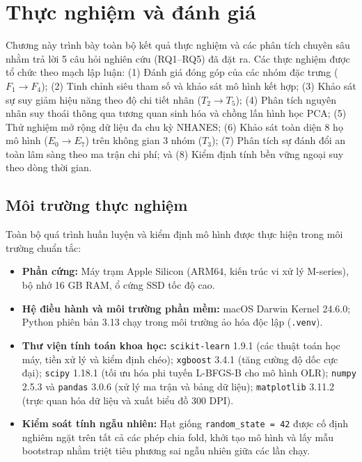 \chapter{Thực nghiệm và đánh giá}
\label{ch:thuc-nghiem}

Chương này trình bày toàn bộ kết quả thực nghiệm và các phân tích chuyên sâu nhằm trả lời 5 câu hỏi nghiên cứu (RQ1--RQ5) đã đặt ra. Các thực nghiệm được tổ chức theo mạch lập luận: (1) Đánh giá đóng góp của các nhóm đặc trưng ($F_1 \to F_4$); (2) Tinh chỉnh siêu tham số và khảo sát mô hình kết hợp; (3) Khảo sát sự suy giảm hiệu năng theo độ chi tiết nhãn ($T_2 \to T_5$); (4) Phân tích nguyên nhân suy thoái thông qua tương quan sinh hóa và chồng lấn hình học PCA; (5) Thử nghiệm mở rộng dữ liệu đa chu kỳ NHANES; (6) Khảo sát toàn diện 8 họ mô hình ($E_0 \to E_7$) trên không gian 3 nhóm ($T_3$); (7) Phân tích sự đánh đổi an toàn lâm sàng theo ma trận chi phí; và (8) Kiểm định tính bền vững ngoại suy theo dòng thời gian.

\section{Môi trường thực nghiệm}
\label{sec:moi-truong-thuc-nghiem}

Toàn bộ quá trình huấn luyện và kiểm định mô hình được thực hiện trong môi trường chuẩn tắc:
\begin{itemize}
    \item \textbf{Phần cứng:} Máy trạm Apple Silicon (ARM64, kiến trúc vi xử lý M-series), bộ nhớ 16 GB RAM, ổ cứng SSD tốc độ cao.
    \item \textbf{Hệ điều hành và môi trường phần mềm:} macOS Darwin Kernel 24.6.0; Python phiên bản 3.13 chạy trong môi trường ảo hóa độc lập (\texttt{.venv}).
    \item \textbf{Thư viện tính toán khoa học:} \texttt{scikit-learn} 1.9.1 (các thuật toán học máy, tiền xử lý và kiểm định chéo); \texttt{xgboost} 3.4.1 (tăng cường độ dốc cực đại); \texttt{scipy} 1.18.1 (tối ưu hóa phi tuyến L-BFGS-B cho mô hình OLR); \texttt{numpy} 2.5.3 và \texttt{pandas} 3.0.6 (xử lý ma trận và bảng dữ liệu); \texttt{matplotlib} 3.11.2 (trực quan hóa dữ liệu và xuất biểu đồ 300 DPI).
    \item \textbf{Kiểm soát tính ngẫu nhiên:} Hạt giống \texttt{random\_state = 42} được cố định nghiêm ngặt trên tất cả các phép chia fold, khởi tạo mô hình và lấy mẫu bootstrap nhằm triệt tiêu phương sai ngẫu nhiên giữa các lần chạy.
\end{itemize}

